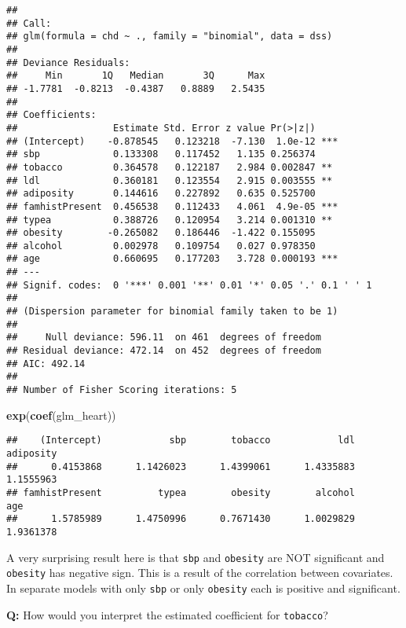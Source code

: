 \documentclass[
]{article}
\newenvironment{Shaded}{\begin{snugshade}}{\end{snugshade}}
\newcommand{\KeywordTok}[1]{\textcolor[rgb]{0.13,0.29,0.53}{\textbf{#1}}}
\newcommand{\NormalTok}[1]{#1}
\begin{document}
\begin{verbatim}
## 
## Call:
## glm(formula = chd ~ ., family = "binomial", data = dss)
## 
## Deviance Residuals: 
##     Min       1Q   Median       3Q      Max  
## -1.7781  -0.8213  -0.4387   0.8889   2.5435  
## 
## Coefficients:
##                 Estimate Std. Error z value Pr(>|z|)    
## (Intercept)    -0.878545   0.123218  -7.130  1.0e-12 ***
## sbp             0.133308   0.117452   1.135 0.256374    
## tobacco         0.364578   0.122187   2.984 0.002847 ** 
## ldl             0.360181   0.123554   2.915 0.003555 ** 
## adiposity       0.144616   0.227892   0.635 0.525700    
## famhistPresent  0.456538   0.112433   4.061  4.9e-05 ***
## typea           0.388726   0.120954   3.214 0.001310 ** 
## obesity        -0.265082   0.186446  -1.422 0.155095    
## alcohol         0.002978   0.109754   0.027 0.978350    
## age             0.660695   0.177203   3.728 0.000193 ***
## ---
## Signif. codes:  0 '***' 0.001 '**' 0.01 '*' 0.05 '.' 0.1 ' ' 1
## 
## (Dispersion parameter for binomial family taken to be 1)
## 
##     Null deviance: 596.11  on 461  degrees of freedom
## Residual deviance: 472.14  on 452  degrees of freedom
## AIC: 492.14
## 
## Number of Fisher Scoring iterations: 5
\end{verbatim}

\begin{Shaded}
\begin{Highlighting}[]
\KeywordTok{exp}\NormalTok{(}\KeywordTok{coef}\NormalTok{(glm_heart))}
\end{Highlighting}
\end{Shaded}

\begin{verbatim}
##    (Intercept)            sbp        tobacco            ldl      adiposity 
##      0.4153868      1.1426023      1.4399061      1.4335883      1.1555963 
## famhistPresent          typea        obesity        alcohol            age 
##      1.5785989      1.4750996      0.7671430      1.0029829      1.9361378
\end{verbatim}

A very surprising result here is that \texttt{sbp} and \texttt{obesity}
are NOT significant and \texttt{obesity} has negative sign. This is a
result of the correlation between covariates. In separate models with
only \texttt{sbp} or only \texttt{obesity} each is positive and
significant.

\textbf{Q:} How would you interpret the estimated coefficient for
\texttt{tobacco}?
\end{document}
